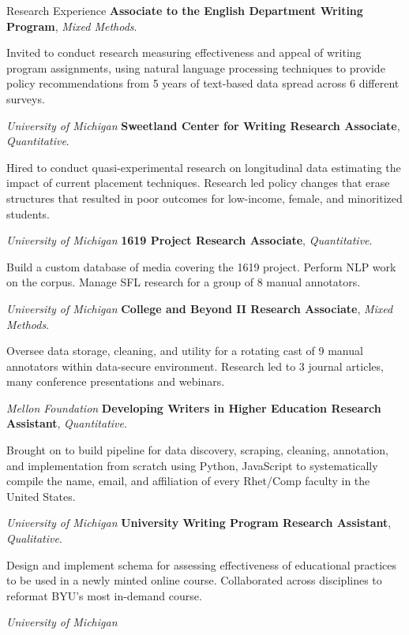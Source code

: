 \begin{rubric}{Research Experience}
    \entry*[2022 -- 2023]%
        \textbf{Associate to the English Department Writing Program}, \textit{Mixed Methods}.
        \par Invited to conduct research measuring effectiveness and appeal of writing program assignments, using natural language processing techniques to provide policy recommendations from 5 years of text-based data spread across 6 different surveys.
        \par\emph{University of Michigan}
    \entry*[2019 -- 2023]%
        \textbf{Sweetland Center for Writing Research Associate}, \textit{Quantitative}.
        \par Hired to conduct quasi-experimental research on longitudinal data estimating the impact of current placement techniques. Research led policy changes that erase structures that resulted in poor outcomes for low-income, female, and minoritized students.
        \par\emph{University of Michigan}
    \entry*[2022 -- 2023]%
        \textbf{1619 Project Research Associate}, \textit{Quantitative}.
        \par Build a custom database of media covering the 1619 project. Perform NLP work on the corpus. Manage SFL research for a group of 8 manual annotators.
        \par\emph{University of Michigan}
    \entry*[2019 -- 2023]%
        \textbf{College and Beyond II Research Associate}, \textit{Mixed Methods}.
        \par Oversee data storage, cleaning, and utility for a rotating cast of 9 manual annotators within data-secure environment. Research led to 3 journal articles, many conference presentations and webinars.
        \par\emph{Mellon Foundation}
    \entry*[2019]%
        \textbf{Developing Writers in Higher Education Research Assistant}, \textit{Quantitative}.
        \par Brought on to build pipeline for data discovery, scraping, cleaning, annotation, and implementation from scratch using Python, JavaScript to systematically compile the name, email, and affiliation of every Rhet/Comp faculty in the United States.
        \par\emph{University of Michigan}
    \entry*[2016 -- 2018]%
        \textbf{University Writing Program Research Assistant}, \textit{Qualitative}.
        \par Design and implement schema for assessing effectiveness of educational practices to be used in a newly minted online course. Collaborated across disciplines to reformat BYU's most in-demand course.
        \par\emph{University of Michigan}
\end{rubric}
